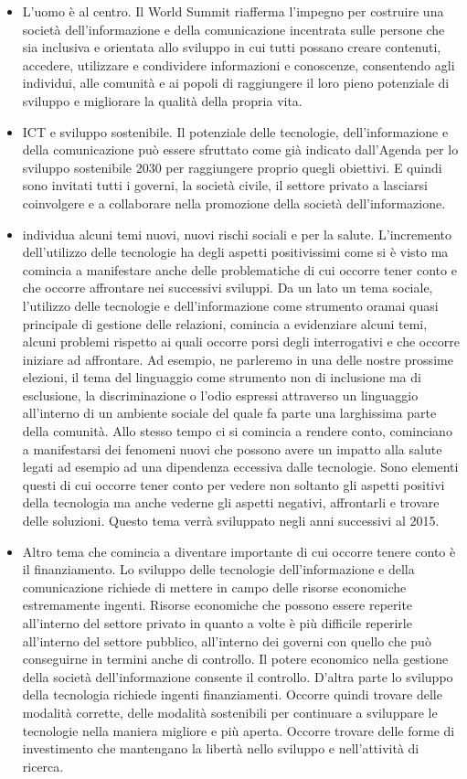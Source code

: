 \begin{itemize}
    \item L'uomo è al centro.  Il World Summit riafferma l'impegno per costruire una società dell'informazione e della comunicazione incentrata sulle persone che sia inclusiva e orientata allo sviluppo in cui tutti possano creare contenuti, accedere, utilizzare e condividere informazioni e conoscenze, consentendo agli individui, alle comunità e ai popoli di raggiungere il loro pieno potenziale di sviluppo e migliorare la qualità della propria vita.
    \item ICT e sviluppo sostenibile. Il potenziale delle tecnologie, dell'informazione e della comunicazione può essere sfruttato come già indicato dall'Agenda per lo sviluppo sostenibile 2030 per raggiungere proprio quegli obiettivi. E quindi sono invitati tutti i governi, la società civile, il settore privato a lasciarsi coinvolgere e a collaborare nella promozione della società dell'informazione.
    \item individua alcuni temi nuovi, nuovi rischi sociali e per la salute. L'incremento dell'utilizzo delle tecnologie ha degli aspetti positivissimi come si è visto ma comincia a manifestare anche delle problematiche di cui occorre tener conto e che occorre affrontare nei successivi sviluppi. Da un lato un tema sociale, l'utilizzo delle tecnologie e dell'informazione come strumento oramai quasi principale di gestione delle relazioni, comincia a evidenziare alcuni temi, alcuni problemi rispetto ai quali occorre porsi degli interrogativi e che occorre iniziare ad affrontare. Ad esempio, ne parleremo in una delle nostre prossime elezioni, il tema del linguaggio come strumento non di inclusione ma di esclusione, la discriminazione o l'odio espressi attraverso un linguaggio all'interno di un ambiente sociale del quale fa parte una larghissima parte della comunità. Allo stesso tempo ci si comincia a rendere conto, cominciano a manifestarsi dei fenomeni nuovi che possono avere un impatto alla salute legati ad esempio ad una dipendenza eccessiva dalle tecnologie. Sono elementi questi di cui occorre tener conto per vedere non soltanto gli aspetti positivi della tecnologia ma anche vederne gli aspetti negativi, affrontarli e trovare delle soluzioni. Questo tema verrà sviluppato negli anni successivi al 2015.
    \item Altro tema che comincia a diventare importante di cui occorre tenere conto è il finanziamento. Lo sviluppo delle tecnologie dell'informazione e della comunicazione richiede di mettere in campo delle risorse economiche estremamente ingenti. Risorse economiche che possono essere reperite all'interno del settore privato in quanto a volte è più difficile reperirle all'interno del settore pubblico, all'interno dei governi con quello che può conseguirne in termini anche di controllo. Il potere economico nella gestione della società dell'informazione consente il controllo. D'altra parte lo sviluppo della tecnologia richiede ingenti finanziamenti. Occorre quindi trovare delle modalità corrette, delle modalità sostenibili per continuare a sviluppare le tecnologie nella maniera migliore e più aperta. Occorre trovare delle forme di investimento che mantengano la libertà nello sviluppo e nell'attività di ricerca.

\end{itemize}
